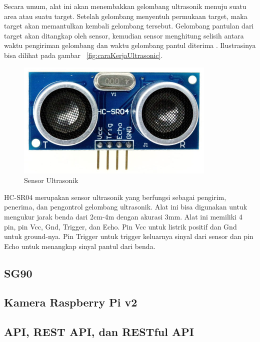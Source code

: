 Secara umum, alat ini akan menembakkan gelombang ultrasonik menuju suatu area atau suatu target. Setelah gelombang menyentuh permukaan target, maka target akan memantulkan kembali gelombang tersebut. Gelombang pantulan dari target akan ditangkap oleh sensor, kemudian sensor menghitung selisih antara waktu pengiriman gelombang dan waktu gelombang pantul diterima . Ilustrasinya bisa dilihat pada gambar ~\ref{fig:caraKerjaUltrasonic}.

\begin{figure} [H]
    \includegraphics[width=0.85\textwidth, center]{images/ultrasonik.jpg}
    \caption{Sensor Ultrasonik}
    \label{fig:Sensor Ultrasonic HC-SR04}
\end{figure}

HC-SR04 merupakan sensor ultrasonik yang berfungsi sebagai pengirim, penerima, dan pengontrol gelombang ultrasonik. Alat ini bisa digunakan untuk mengukur jarak benda dari 2cm-4m dengan akurasi 3mm. Alat ini memiliki 4 pin, pin Vcc, Gnd, Trigger, dan Echo. Pin Vcc untuk listrik positif dan Gnd untuk ground-nya. Pin Trigger untuk trigger keluarnya sinyal dari sensor dan pin Echo untuk menangkap sinyal pantul dari benda.

\subsection{SG90}

\subsection{Kamera Raspberry Pi v2}

\subsection{API, REST API, dan RESTful API}

